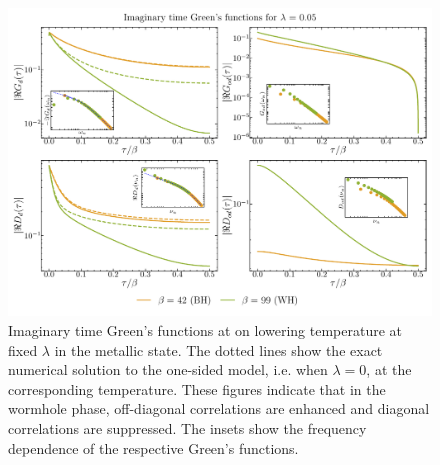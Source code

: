 \begin{figure}[t!]
    \centering
    \includegraphics[width=\linewidth]{figures/chapter3/LLINSETGreenFunctionPlotsMetal.pdf}
    \caption{Imaginary time Green's functions at on lowering temperature at fixed $\lambda$ in the metallic state. The dotted lines show the exact numerical solution to the one-sided model, i.e. when $\lambda = 0$, at the corresponding temperature. These figures indicate that in the wormhole phase, off-diagonal correlations are enhanced and diagonal correlations are suppressed. The insets show the frequency dependence of the respective Green's functions.}
    \label{fig:GreenFunctionPlotsMetal}
\end{figure}


